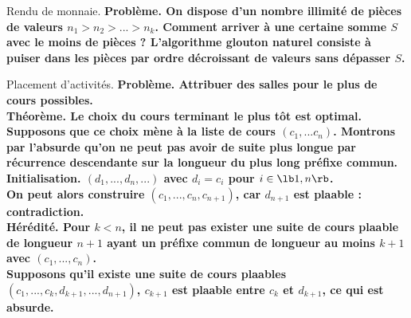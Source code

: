 \documentclass[french, 11pt]{article}
\begin{document}
\begin{ex}{Rendu de monnaie.}{}
    \bf{Problème.} On dispose d'un nombre illimité de pièces de valeurs $n_1>n_2>...>n_k$. Comment arriver à une certaine somme $S$ avec le moins de pièces ?\n
    L'algorithme glouton naturel consiste à puiser dans les pièces par ordre décroissant de valeurs sans dépasser $S$.
\end{ex}

\begin{ex}{Placement d'activités.}{}
    \bf{Problème.} Attribuer des salles pour le plus de cours possibles.\\
    \bf{Théorème.} Le choix du cours terminant le plus tôt est optimal.
    \tcblower
    Supposons que ce choix mène à la liste de cours $(c_1,...c_n)$. Montrons par l'absurde qu'on ne peut pas avoir de suite plus longue par récurrence descendante sur la longueur du plus long préfixe commun.\\
    \bf{Initialisation.} $(d_1,...,d_n,...)$ avec $d_i=c_i$ pour $i\in\lb1,n\rb$.\\
    On peut alors construire $(c_1,...,c_n,c_{n+1})$, car $d_{n+1}$ est plaable : contradiction.\\
    \bf{Hérédité.} Pour $k<n$, il ne peut pas exister une suite de cours plaable de longueur $n+1$ ayant un préfixe commun de longueur au moins $k+1$ avec $(c_1,...,c_n)$.\\
    Supposons qu'il existe une suite de cours plaables $(c_1,...,c_k,d_{k+1},...,d_{n+1})$, $c_{k+1}$ est plaable entre $c_k$ et $d_{k+1}$, ce qui est absurde.
\end{ex}

\vspace*{-0.7cm}
\end{document}
